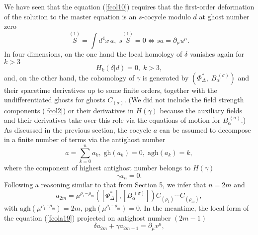 \documentclass[a4paper,12pt]{article}
\begin{document}
We have seen that the equation (\ref{fcol10}) requires that the first-order
deformation of the solution to the master equation is an $s$-cocycle modulo $%
d$ at ghost number zero 
\begin{equation}
\stackrel{(1)}{S}=\int d^{4}x\,a,\;s\stackrel{(1)}{S}=0\Leftrightarrow
sa=\partial _{\mu }u^{\mu }.  \label{fcola19}
\end{equation}
In four dimensions, on the one hand the local homology of $\delta $ vanishes
again for $k>3$ \cite{20and5} 
\begin{equation}
H_{k}\left( \delta |d\right) =0,\;k>3,  \label{fcola19a}
\end{equation}
and, on the other hand, the cohomology of $\gamma $ is generated by $\left(
\Phi _{\Delta }^{*},\;B_{\alpha }^{\;(\sigma )}\right) $ and their spacetime
derivatives up to some finite orders, together with the undifferentiated
ghosts for ghosts $C_{(\sigma )}$. (We did not include the field strength
components (\ref{fcol2}) or their derivatives in $H\left( \gamma \right) $
because the auxiliary fields and their derivatives take over this role via
the equations of motion for $B_{\alpha }^{\;(\sigma )}$.) As discussed in
the previous section, the cocycle $a$ can be assumed to decompose in a
finite number of terms via the antighost number 
\begin{equation}
a=\sum_{k=0}^{n}a_{k},\;\mathrm{gh}\left( a_{k}\right) =0,\;\mathrm{agh}%
\left( a_{k}\right) =k,  \label{fcola20}
\end{equation}
where the component of highest antighost number belongs to $H\left( \gamma
\right) $ 
\begin{equation}
\gamma a_{n}=0.  \label{fcola21}
\end{equation}
Following a reasoning similar to that from Section 5, we infer that $n=2m$
and 
\begin{equation}
a_{2m}=\mu ^{\rho _{1}\cdots \rho _{m}}\left( \left[ \Phi _{\Delta
}^{*}\right] ,\left[ B_{\alpha }^{\;(\sigma )}\right] \right) C_{(\rho
_{1})}\cdots C_{(\rho _{m})},  \label{fcola23}
\end{equation}
with $\mathrm{agh}\left( \mu ^{\rho _{1}\cdots \rho _{m}}\right) =2m$, $%
\mathrm{pgh}\left( \mu ^{\rho _{1}\cdots \rho _{m}}\right) =0$. In the
meantime, the local form of the equation (\ref{fcola19}) projected on
antighost number $\left( 2m-1\right) $%
\begin{equation}
\delta a_{2m}+\gamma a_{2m-1}=\partial _{\mu }v^{\mu },  \label{fcola22}
\end{equation}
\end{document}
